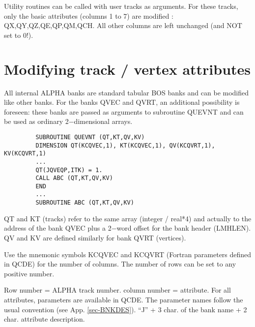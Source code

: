 Utility routines can be called with user tracks as arguments. For
these
tracks, only the basic attributes (columns 1 to 7) are
modified : QX,QY,QZ,QE,QP,QM,QCH. All other
columns are left unchanged (and NOT set to 0!).
 
\section{\label{sec-MBTV}Modifying track / vertex attributes}
\par
All internal ALPHA banks are standard tabular BOS banks and can be
modified like other banks. For the banks QVEC and QVRT, an additional
possibility is foreseen: these banks are passed as arguments to
subroutine QUEVNT and can be used as ordinary 2$-$dimensional arrays.
\begin{verbatim}
         SUBROUTINE QUEVNT (QT,KT,QV,KV)
         DIMENSION QT(KCQVEC,1), KT(KCQVEC,1), QV(KCQVRT,1), KV(KCQVRT,1)
         ...
         QT(JQVEQP,ITK) = 1.
         CALL ABC (QT,KT,QV,KV)
         END
         ...
         SUBROUTINE ABC (QT,KT,QV,KV)
\end{verbatim}
\begin{indentlist}{ 3.75cm}{ 4.00cm}
QT and KT (tracks) refer to the same array (integer / real*4)
and actually to the address of the bank QVEC plus a 2$-$word
offset for the bank header (LMHLEN). QV and KV are defined
similarly for bank QVRT (vertices).
 
Use the mnemonic symbols KCQVEC and KCQVRT
(Fortran parameters defined in QCDE) for the number of
columns. The number of rows can be set to any positive number.
 
Row number = ALPHA track number.
column number = attribute. For all attributes, parameters
are available in QCDE. The parameter names follow the usual
convention (see App. \ref{sec-BNKDES}).
``J'' + 3 char. of the bank name + 2 char. attribute description.
\end{indentlist}
